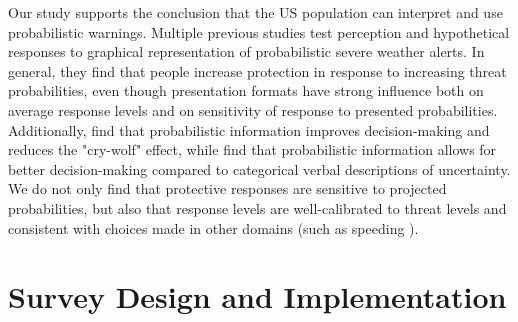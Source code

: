 \documentclass{ametsocV6.1}
\begin{document}
Our study supports the conclusion that the US population can interpret and use probabilistic warnings. Multiple previous studies \citep{ash_tornado_2014, lindell_perceptions_2016, miran_user_2017-1} test perception and hypothetical responses to graphical representation of probabilistic severe weather alerts. In general, they find that people increase protection in response to increasing threat probabilities, even though presentation formats have strong influence both on average response levels and on sensitivity of response to presented probabilities. Additionally, \cite{leclerc_cry_2015} find that probabilistic information improves decision-making and reduces the "cry-wolf" effect, while \citet{krocak_exploring_2022} find that probabilistic information allows for better decision-making compared to categorical verbal descriptions of uncertainty. We do not only find that protective responses are sensitive to projected probabilities, but also that response levels are well-calibrated to threat levels and consistent with choices made in other domains (such as speeding \citep{wolff_value_2014}).



\vspace{20pt}

\section{Survey Design and Implementation}

\vspace{10pt}
\end{document}
